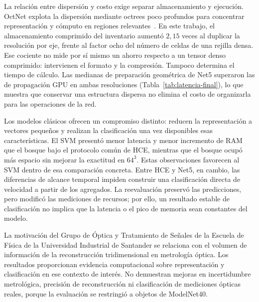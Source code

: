 La relación entre dispersión y costo exige separar almacenamiento y ejecución. OctNet explota la dispersión mediante octrees poco profundos para concentrar representación y cómputo en regiones relevantes~\parencite{riegler2017}. En este trabajo, el almacenamiento comprimido del inventario aumentó $2{,}15$ veces al duplicar la resolución por eje, frente al factor ocho del número de celdas de una rejilla densa. Ese cociente no mide por sí mismo un ahorro respecto a un tensor denso comprimido: intervienen el formato y la compresión. Tampoco determina el tiempo de cálculo. Las medianas de preparación geométrica de Net5 superaron las de propagación GPU en ambas resoluciones (Tabla~\ref{tab:latencia-final}), lo que muestra que conservar una estructura dispersa no elimina el costo de organizarla para las operaciones de la red.

Los modelos clásicos ofrecen un compromiso distinto: reducen la representación a vectores pequeños y realizan la clasificación una vez disponibles esas características. El SVM presentó menor latencia y menor incremento de RAM que el bosque bajo el protocolo común de HCE, mientras que el bosque ocupó más espacio sin mejorar la exactitud en $64^3$. Estas observaciones favorecen al SVM dentro de esa comparación concreta. Entre HCE y Net5, en cambio, las diferencias de alcance temporal impiden construir una clasificación directa de velocidad a partir de los agregados. La reevaluación preservó las predicciones, pero modificó las mediciones de recursos; por ello, un resultado estable de clasificación no implica que la latencia o el pico de memoria sean constantes del modelo.

La motivación del Grupo de Óptica y Tratamiento de Señales de la Escuela de Física de la Universidad Industrial de Santander se relaciona con el volumen de información de la reconstrucción tridimensional en metrología óptica. Los resultados proporcionan evidencia computacional sobre representación y clasificación en ese contexto de interés. No demuestran mejoras en incertidumbre metrológica, precisión de reconstrucción ni clasificación de mediciones ópticas reales, porque la evaluación se restringió a objetos de ModelNet40.

